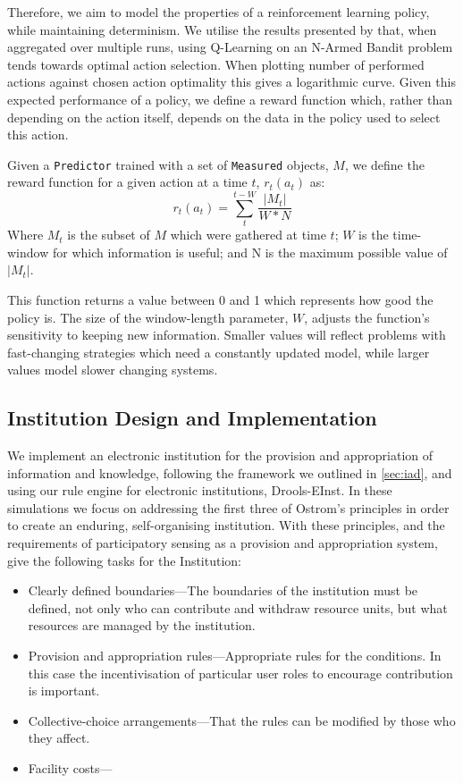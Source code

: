 Therefore, we aim to model the properties of a reinforcement learning policy,
while maintaining determinism. We utilise the results presented by
\citet[ch.2]{Sutton1998} that, when aggregated over multiple runs, using
Q-Learning on an N-Armed Bandit problem tends towards optimal action
selection. When plotting number of performed actions against chosen action
optimality this gives a logarithmic curve. Given this expected performance of
a policy, we define a reward function which, rather than depending on the
action itself, depends on the data in the policy used to select this action.

Given a \texttt{Predictor} trained with a set of \texttt{Measured} objects, $M$, we define the reward function for a given action at a time $t$, $r_t(a_t)$ as:
\begin{equation*}
r_t(a_t) = \sum_t^{t-W} \frac{|M_t|}{W*N}
\end{equation*}
Where $M_t$ is the subset of $M$ which were gathered at time $t$; $W$ is the time-window for which information is useful; and N is the maximum possible value of $|M_t|$.

This function returns a value between 0 and 1 which represents how good the
policy is. The size of the window-length parameter, $W$, adjusts the
function's sensitivity to keeping new information. Smaller values will reflect
problems with fast-changing strategies which need a constantly updated model,
while larger values model slower changing systems.

\subsection{Institution Design and Implementation}

We implement an electronic institution for the provision and appropriation of
information and knowledge, following the framework we outlined in
\autoref{sec:iad}, and using our rule engine for electronic institutions,
Drools-EInst. In these simulations we focus on addressing the first three of
Ostrom's principles in order to create an enduring, self-organising
institution. With these principles, and the requirements of participatory sensing as a provision and appropriation system, give the following tasks for the Institution:

\begin{itemize}
\item Clearly defined boundaries---The boundaries of the institution must be defined, not only who can contribute and withdraw resource units, but what resources are managed by the institution.
\item Provision and appropriation rules---Appropriate rules for the conditions. In this case the incentivisation of particular user roles to encourage contribution is important.
\item Collective-choice arrangements---That the rules can be modified by those who they affect.
\item Facility costs---
\end{itemize}

